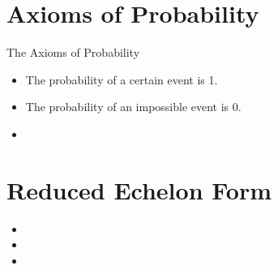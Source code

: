 \section*{Axioms of Probability}

The Axioms of Probability

\begin{itemize}
\item The probability of a certain event is 1.
\item The probability of an impossible event is 0.
\item 
\end{itemize}
\section*{Reduced Echelon Form}

\begin{itemize}
\item
\item
\item
\end{itemize}
